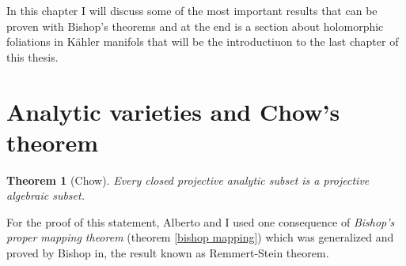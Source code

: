 \documentclass[12pt,twoside,a4paper]{report}
\newtheorem{theorem}{Theorem}[section]
\begin{document}
  \noindent In this chapter I will discuss some of the most important results that can be proven with Bishop's theorems and at the end is a section about holomorphic foliations in Kähler manifols that will be the introductiuon to the last chapter of this thesis.

  \section{Analytic varieties and Chow's theorem}

  \begin{theorem}[Chow]
    Every closed projective analytic subset is a projective algebraic subset.
  \end{theorem}

  For the proof of this statement, Alberto and I used one consequence of \emph{Bishop's proper mapping theorem} (theorem \ref{bishop mapping}) which was generalized and proved by Bishop in\cite{Bishop}, the result known as Remmert-Stein theorem.
\end{document}
